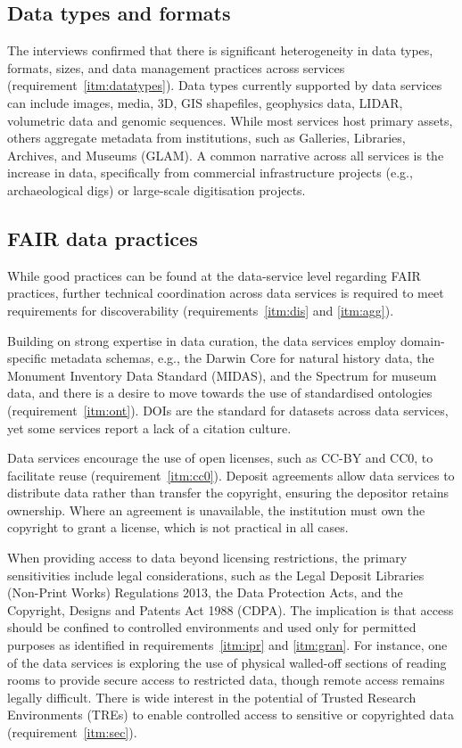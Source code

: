 \documentclass[11pt]{scrartcl}
\begin{document}
\subsection{Data types and formats}
The interviews confirmed that there is significant heterogeneity in data types, formats, sizes, and data management practices across services (requirement~\ref{itm:datatypes}).  
Data types currently supported by data services can include images, media, 3D, GIS shapefiles, geophysics data, LIDAR, volumetric data and genomic sequences. While most services host primary assets, others aggregate metadata from institutions, such as Galleries, Libraries, Archives, and Museums (GLAM). A common narrative across all services is the increase in data, specifically from commercial infrastructure projects (e.g., archaeological digs) or large-scale digitisation projects. 

\subsection{FAIR data practices}
While good practices can be found at the data-service level regarding FAIR practices, further technical coordination across data services is required to meet requirements for discoverability (requirements~\ref{itm:dis} and \ref{itm:agg}).

Building on strong expertise in data curation, the data services employ domain-specific metadata schemas, e.g., the Darwin Core for natural history data, the Monument Inventory Data Standard (MIDAS), and the Spectrum for museum data, and there is a desire to move towards the use of standardised ontologies (requirement~\ref{itm:ont}). DOIs are the standard for datasets across data services, yet some services report a lack of a citation culture.  

Data services encourage the use of open licenses, such as CC-BY and CC0, to facilitate reuse (requirement~\ref{itm:cc0}). Deposit agreements allow data services to distribute data rather than transfer the copyright, ensuring the depositor  retains  ownership. Where an agreement is unavailable, the institution must own the copyright to grant a license, which is not practical in all cases.

When providing access to data beyond licensing restrictions, the primary sensitivities include legal considerations, such as the Legal Deposit Libraries (Non-Print Works) Regulations 2013, the Data Protection Acts, and the Copyright, Designs and Patents Act 1988 (CDPA). The implication is that access should be confined to controlled environments and used only for permitted purposes as identified in requirements~\ref{itm:ipr} and \ref{itm:gran}. For instance, one of the data services is exploring the use of physical walled-off sections of reading rooms to provide secure access to restricted data, though remote access remains legally difficult. There is wide interest in the potential of Trusted Research Environments (TREs) to enable controlled access to sensitive or copyrighted data (requirement~\ref{itm:sec}). 
  
\end{document}
